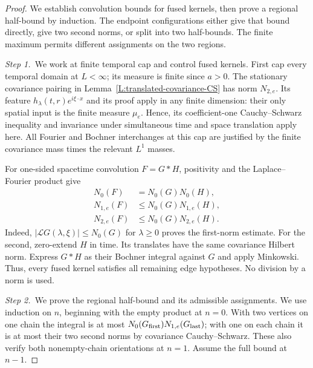 \documentclass[12pt,oneside,openany]{book}
\numberwithin{equation}{section}
\theoremstyle{nogostyle}
\theoremstyle{definition}
\begin{document}
\begin{proof}
  We establish convolution bounds for fused kernels, then prove a regional
  half-bound by induction. The endpoint configurations either give that bound
  directly, give two second norms, or split into two half-bounds. The finite
  maximum permits different assignments on the two regions.


  \medskip
  \noindent\textit{Step 1.~}We work at finite temporal cap and control fused
  kernels.
  First cap every temporal domain at $L < \infty$; its measure is finite since
  $a > 0$. The stationary covariance pairing in
  Lemma~\ref{L:translated-covariance-CS} has norm $N_{2,e}$. Its feature
  $h_\lambda(t,r)e^{i\xi\cdot x}$ and its proof apply in any finite dimension:
  their only spatial input is the finite measure $\mu_e$. Hence, its
  coefficient-one Cauchy--Schwarz inequality and invariance under simultaneous
  time and space translation apply here. All Fourier and Bochner interchanges at
  this cap are justified by the finite covariance mass times the relevant $L^1$
  masses.

  For one-sided spacetime convolution $F = G*H$, positivity and the
  Laplace--Fourier product give
  \begin{equation}\label{E:pairing-convolution-norms}
    \begin{split}
      N_0(F)&=N_0(G)N_0(H),\\
      N_{1,e}(F)&\le N_0(G)N_{1,e}(H),\\
      N_{2,e}(F)&\le N_0(G)N_{2,e}(H).
    \end{split}
  \end{equation}
  Indeed, $|\mathcal{L} G(\lambda,\xi)| \le N_0(G)$ for $\lambda \ge 0$ proves
  the first-norm estimate. For the second, zero-extend $H$ in time. Its
  translates have the same covariance Hilbert norm. Express $G*H$ as their
  Bochner integral against $G$ and apply Minkowski. Thus, every fused kernel
  satisfies all remaining edge hypotheses. No division by a norm is used.


  \medskip
  \noindent\textit{Step 2.~}We prove the regional half-bound and its
  admissible assignments.
  We use induction on $n$, beginning with the empty product at $n = 0$. With two
  vertices on one chain the integral is at most $N_0(G_{\rm
  first})N_{1,e}(G_{\rm last})$; with one on each chain it is at most their two
  second norms by covariance Cauchy--Schwarz. These also verify both
  nonempty-chain orientations at $n = 1$. Assume the full bound at $n-1$.


\end{proof}
\end{document}
